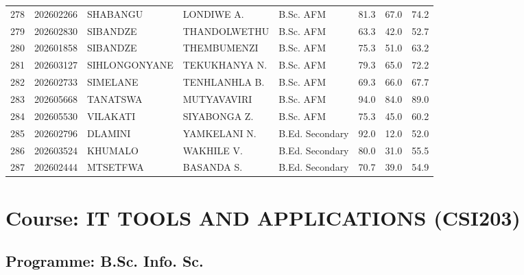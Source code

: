 \documentclass[12pt]{article}
\begin{document}
\begin{longtable}{@{}llllllll@{}}
278 & 202602266 & SHABANGU & LONDIWE A. & B.Sc. AFM & 81.3 & 67.0 & 74.2 \\
279 & 202602830 & SIBANDZE & THANDOLWETHU & B.Sc. AFM & 63.3 & 42.0 & 52.7 \\
280 & 202601858 & SIBANDZE & THEMBUMENZI & B.Sc. AFM & 75.3 & 51.0 & 63.2 \\
281 & 202603127 & SIHLONGONYANE & TEKUKHANYA N. & B.Sc. AFM & 79.3 & 65.0 & 72.2 \\
282 & 202602733 & SIMELANE & TENHLANHLA B. & B.Sc. AFM & 69.3 & 66.0 & 67.7 \\
283 & 202605668 & TANATSWA & MUTYAVAVIRI & B.Sc. AFM & 94.0 & 84.0 & 89.0 \\
284 & 202605530 & VILAKATI & SIYABONGA Z. & B.Sc. AFM & 75.3 & 45.0 & 60.2 \\

285 & 202602796 & DLAMINI & YAMKELANI N. & B.Ed. Secondary & 92.0 & 12.0 & 52.0 \\
286 & 202603524 & KHUMALO & WAKHILE V. & B.Ed. Secondary & 80.0 & 31.0 & 55.5 \\
287 & 202602444 & MTSETFWA & BASANDA S. & B.Ed. Secondary & 70.7 & 39.0 & 54.9 \\

\end{longtable}

\clearpage

\section*{Course: IT TOOLS AND APPLICATIONS (CSI203)}
\subsection*{Programme: B.Sc. Info. Sc.}
\end{document}
